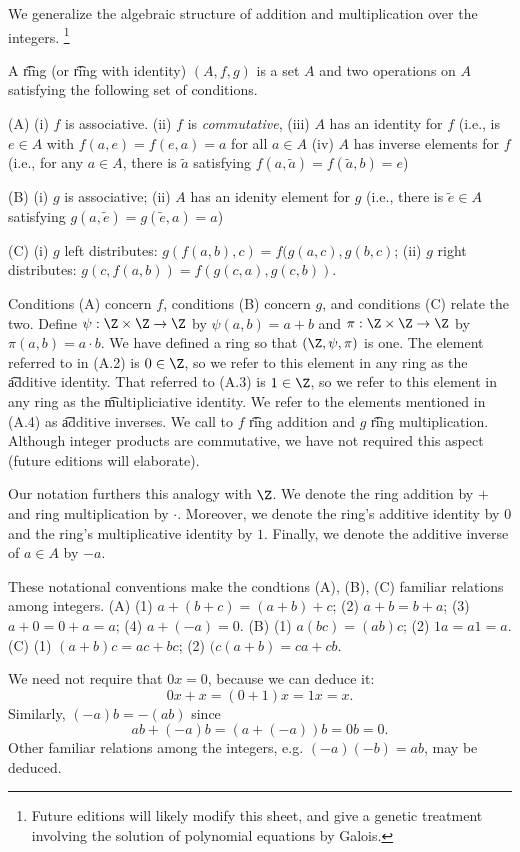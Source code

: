 

We generalize the algebraic structure of addition and multiplication over the integers.
  \ifhmode\unskip\fi\footnote{
Future editions will likely modify this sheet, and give a genetic treatment involving the solution of polynomial equations by Galois.
  }


A \t{ring} (or \t{ring with identity}) $(A, f, g)$ is a set $A$ and two operations on $A$ satisfying the following set of conditions.

(A)
(i) $f$ is associative.
(ii) $f$ is \textit{commutative},
(iii) $A$ has an identity for $f$ (i.e., is $e \in A$ with $f(a, e) = f(e, a) = a$ for all $a \in A$
(iv) $A$ has inverse elements for $f$ (i.e., for any $a \in A$, there is $\tilde{a} $ satisfying $f(a,\tilde{a}) = f(\tilde{a}, b) = e$)

(B)
(i) $g$ is associative;
(ii) $A$ has an idenity element for $g$ (i.e., there is $\tilde{e} \in A$ satisfying $g(a, \tilde{e}) = g(\tilde{e},a) = a$)

(C)
(i) $g$ left distributes: $g(f(a, b), c) = f(g(a,c), g(b,c)$;
(ii) $g$ right distributes: $g(c,f(a,b)) = f(g(c,a), g(c,b))$.

Conditions (A) concern $f$, conditions (B) concern $g$, and conditions (C) relate the two.
Define $\psi : \Z  \times \Z  \to \Z $ by $\psi (a, b) = a+b$ and $\pi : \Z  \times \Z  \to \Z $ by $\pi(a, b) = a\cdot b$.
We have defined a ring so that $(\Z , \psi , \pi )$ is one.
The element referred to in (A.2) is $0 \in \Z $, so we refer to this element in any ring as the \t{additive identity}.
That referred to (A.3) is $1 \in \Z $, so we refer to this element in any ring as the \t{multipliciative identity}.
We refer to the elements mentioned in (A.4) as \t{additive inverses}.
We call to $f$ \t{ring addition} and $g$ \t{ring multiplication}.
Although integer products are commutative, we have not required this aspect (future editions will elaborate).

Our notation furthers this analogy with $\Z $.
We denote the ring addition by $+$ and ring multiplication by $\cdot $.
Moreover, we denote the ring's additive identity by $0$ and the ring's multiplicative identity by $1$.
Finally, we denote the additive inverse of $a \in A$ by $-a$.

These notational conventions make the condtions (A), (B), (C) familiar relations among integers.
(A) (1) $a+(b + c) = (a+b)+c$; (2) $a+b = b+a$; (3) $a + 0 = 0 + a = a$; (4) $a + (-a) = 0$.
(B) (1) $a(bc) = (ab)c$; (2) $1a = a1 = a$.
(C) (1) $(a+b)c = ac + bc$; (2) $(c(a+b) = ca + cb$.

We need not require that $0x = 0$, because we can deduce it:
  \[
0x + x = (0 + 1)x = 1x = x.
  \]
Similarly, $(-a)b = -(ab)$ since
  \[
ab + (-a)b = (a + (-a))b = 0b = 0.
  \]
Other familiar relations among the integers, e.g. $(-a)(-b) = ab$, may be deduced.
